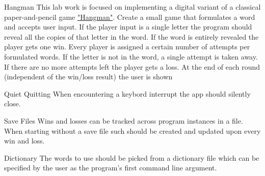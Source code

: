 \begin{lab}{Hangman}
    This lab work is focused on implementing a digital variant of a classical 
    paper-and-pencil game \href{https://en.wikipedia.org/wiki/Hangman_(game)}{"Hangman"}.
    Create a small game that formulates a word and accepts user input.
    If the player input is a single letter the program should reveal all the copies of
    that letter in the word. If the word is entirely revealed the player gets one win.
    Every player is assigned a certain number of attempts per formulated words.
    If the letter is not in the word, a single attempt is taken away. If there are 
    no more attempts left the player gets a loss. At the end of each round
    (independent of the win/loss result) the user is shown

    \begin{labext}{Quiet Quitting}
        When encountering a keybord interrupt the app should silently close.
    \end{labext}
    \begin{labext}{Save Files}
        Wins and losses can be tracked across program instances in a file. 
        When starting without a save file such should be created and updated
        upon every win and loss.
    \end{labext}
    \begin{labext}{Dictionary}
        The words to use should be picked from a dictionary file which can be
        specified by the user as the program's first command line argument.
    \end{labext}
\end{lab}
